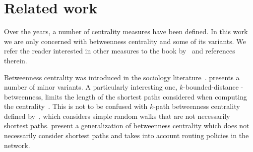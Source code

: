 \section{Related work}\label{sec:prevwork}
Over the years, a number of centrality measures have been defined. In this work
we are only concerned with betweenness centrality and some of its variants. We
refer the reader interested in other measures to the book by~\citet{Newman10} and
references therein.

Betweenness centrality was introduced in the sociology
literature~\citep{Anthonisse71,Freeman77}. \citet{Brandes08} presents a number
of minor variants. A particularly interesting one, $k$-bounded-distance -betweenness, limits the
length of the shortest paths considered when computing the
centrality~\citep{BorgattiE06,Brandes08,PfefferC12}. This is not to be confused
with $k$-path betweenness centrality defined by~\citet{KourtellisASIT12}, which considers
simple random walks that are not necessarily shortest paths. \citet{DolevEP10} present
a generalization of betweenness centrality which does not necessarily consider
shortest paths and takes into account routing policies in the network. 

